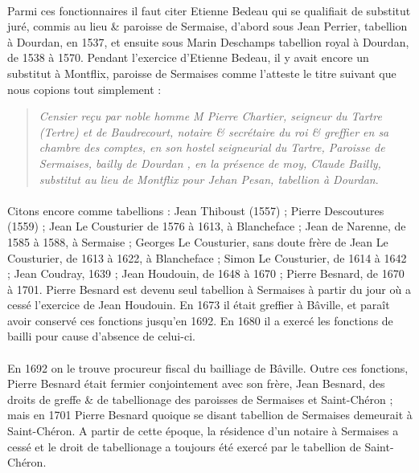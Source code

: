 \documentclass[../eBook.tex]{subfiles}
\begin{document}
      \paragraph{}Parmi ces fonctionnaires il faut citer Etienne Bedeau qui se qualifiait de substitut juré, commis au lieu \& paroisse de Sermaise, d'abord sous Jean Perrier, tabellion à Dourdan, en 1537, et ensuite sous Marin Deschamps tabellion royal à Dourdan, de 1538 à 1570. Pendant l'exercice d'Etienne Bedeau, il y avait encore un substitut à Montflix, paroisse de Sermaises comme l'atteste le titre suivant que nous copions tout simplement :
      \begin{quote}
        \og \textit{Censier reçu par noble homme M Pierre Chartier, seigneur du Tartre (Tertre) et de Baudrecourt, notaire \& secrétaire du roi \& greffier en sa chambre des comptes, en son hostel seigneurial du Tartre, Paroisse de Sermaises, bailly de Dourdan , en la présence de moy, Claude Bailly, substitut au lieu de Montflix pour Jehan Pesan, tabellion à Dourdan}. \fg{}
      \end{quote}
      \paragraph{}Citons encore comme tabellions : Jean Thiboust (1557) ; Pierre Descoutures  (1559) ; Jean Le Cousturier de 1576 à 1613, à Blancheface ; Jean de Narenne, de 1585 à 1588, à Sermaise ; Georges Le Cousturier, sans doute frère de Jean Le Cousturier, de 1613 à 1622, à Blancheface ; Simon Le Cousturier, de 1614 à 1642 ; Jean Coudray, 1639 ; Jean Houdouin, de 1648 à 1670 ; Pierre Besnard, de 1670 à 1701. Pierre Besnard est devenu seul tabellion à Sermaises à partir du jour où a cessé l'exercice de Jean Houdouin. En 1673 il était greffier à Bâville, et paraît avoir conservé ces fonctions jusqu'en 1692. En 1680 il a exercé les fonctions de bailli pour cause d'absence de celui-ci.
      \paragraph{}En 1692 on le trouve procureur fiscal du bailliage de Bâville. Outre ces fonctions, Pierre Besnard était fermier conjointement avec son frère, Jean Besnard, des droits de greffe \& de tabellionage des paroisses de Sermaises et Saint-Chéron ; mais en 1701 Pierre Besnard quoique se disant tabellion de Sermaises demeurait à Saint-Chéron. A partir de cette époque, la résidence d'un notaire à Sermaises a cessé et le droit de tabellionage a toujours été exercé par le tabellion de Saint-Chéron.
\end{document}
